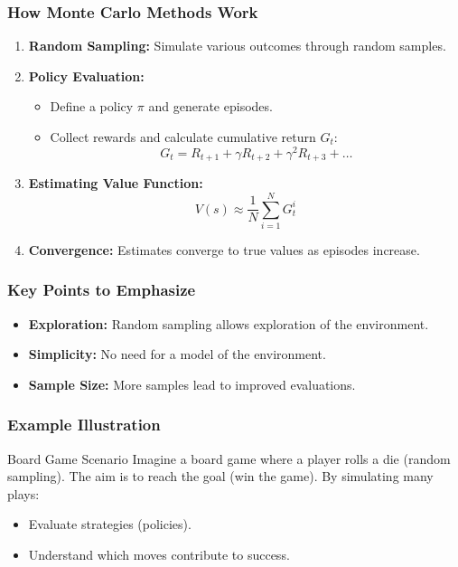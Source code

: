 \documentclass[aspectratio=169]{beamer}
\begin{document}
\begin{frame}[fragile]
    \frametitle{How Monte Carlo Methods Work}
    \begin{enumerate}
        \item \textbf{Random Sampling:} Simulate various outcomes through random samples.
        \item \textbf{Policy Evaluation:}
            \begin{itemize}
                \item Define a policy $\pi$ and generate episodes.
                \item Collect rewards and calculate cumulative return $G_t$:
                \[
                G_t = R_{t+1} + \gamma R_{t+2} + \gamma^2 R_{t+3} + \ldots
                \]
            \end{itemize}
        \item \textbf{Estimating Value Function:}
            \[
            V(s) \approx \frac{1}{N} \sum_{i=1}^{N} G_t^i
            \]
        \item \textbf{Convergence:} Estimates converge to true values as episodes increase.
    \end{enumerate}
\end{frame}

\begin{frame}[fragile]
    \frametitle{Key Points to Emphasize}
    \begin{itemize}
        \item \textbf{Exploration:} Random sampling allows exploration of the environment.
        \item \textbf{Simplicity:} No need for a model of the environment.
        \item \textbf{Sample Size:} More samples lead to improved evaluations.
    \end{itemize}
\end{frame}

\begin{frame}[fragile]
    \frametitle{Example Illustration}
    \begin{block}{Board Game Scenario}
        Imagine a board game where a player rolls a die (random sampling). The aim is to reach the goal (win the game). By simulating many plays:
        \begin{itemize}
            \item Evaluate strategies (policies).
            \item Understand which moves contribute to success.
        \end{itemize}
    \end{block}
\end{frame}
\end{document}

